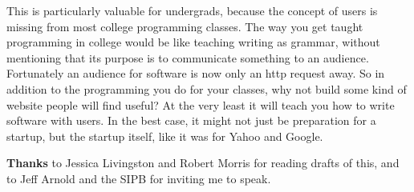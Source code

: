 \documentclass[12pt]{book}
\begin{document}
This is particularly valuable for undergrads, because the concept of
users is missing from most college programming classes. The way you get
taught programming in college would be like teaching writing as grammar,
without mentioning that its purpose is to communicate something to an
audience. Fortunately an audience for software is now only an http
request away. So in addition to the programming you do for your classes,
why not build some kind of website people will find useful? At the very
least it will teach you how to write software with users. In the best
case, it might not just be preparation for a startup, but the startup
itself, like it was for Yahoo and Google.


\textbf{Thanks} to Jessica Livingston and Robert Morris for reading
drafts of this, and to Jeff Arnold and the SIPB for inviting me to
speak.
\end{document}
